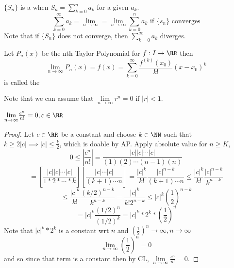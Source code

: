 \documentclass[12pt]{scrartcl}
\begin{document}
\begin{definition}
  $\{S_n\}$ is a  when $S_n = \sum_{k=0}^n a_k$ for a given $a_k$. 
  \[\sum_{k=0}^\infty a_k = \lim_{n\to\infty} = \lim_{n\to\infty} \sum_{k=0}^n a_k \text{ if } \{s_n\} \text{ converges}\]
  Note that if $\{S_n\}$ does not converge, then $\sum_{k=0}^\infty a_k$ diverges. 
\end{definition}

\begin{definition}
  Let $P_n(x)$ be the nth Taylor Polynomial for $f: I \to \RR$ then 
  \[\lim_{n\to\infty}P_n(x) = f(x) = \sum_{k=0}^\infty \frac{f^{(k)}(x_0)}{k!}(x-x_0)^k\]
  is called the 
\end{definition}

\begin{note}
  Note that we can assume that $\underset{n\to\infty}{\lim}r^n = 0$ if $|r| < 1$.
\end{note}

\begin{lemma}
  $\underset{n\to\infty}{\lim}\frac{c^n}{n!} = 0, c \in \RR$

  \begin{proof}
    Let $c \in \RR$ be a constant and choose $k \in \NN$ such that $k \geq 2|c| \implies |c| \leq \frac{k}{2}$, which is doable by AP.  Apply absolute value for $n \geq K$, \[0 \leq |\frac{c^n}{n!}| = \frac{|c||c| \cdots |c|}{(1)(2) \cdots (n-1)(n)}\] 
    \[= \left[ \frac{|c||c|\cdots|c|}{1 * 2 * \cdots * k} \right] \left[ \frac{|c|\cdots|c|}{(k+1)\cdots n}\right] = \frac{|c|^k}{k!}\frac{|c|^{n-k}}{(k+1)\cdots n} \leq \frac{|c|^k}{k!}\frac{|c|^{n-k}}{k^{n-k}}\]
    \[\leq \frac{|c|^k}{k!}\frac{(k/2)^{n-k}}{k^{n-k}} = \frac{|c|^k}{k! 2^{n-k}} \leq |c|^k (\frac{1}{2})^{n-k}\]
    \[= |c|^k \frac{(1/2)^n}{(1/2)^k} = |c|^k * 2^k * (\frac{1}{2})^n\]
    Note that $|c|^k * 2^k$ is a constant wrt $n$ and $(\frac{1}{2})^n \to \infty, n \to \infty$
    \[\lim_{n\to\infty}(\frac{1}{2})^n = 0\] and so since that term is a constant
    then by CL, $\underset{n\to\infty}{\lim}\frac{c^n}{n!} = 0$.
  \end{proof}
\end{lemma}
\end{document}
